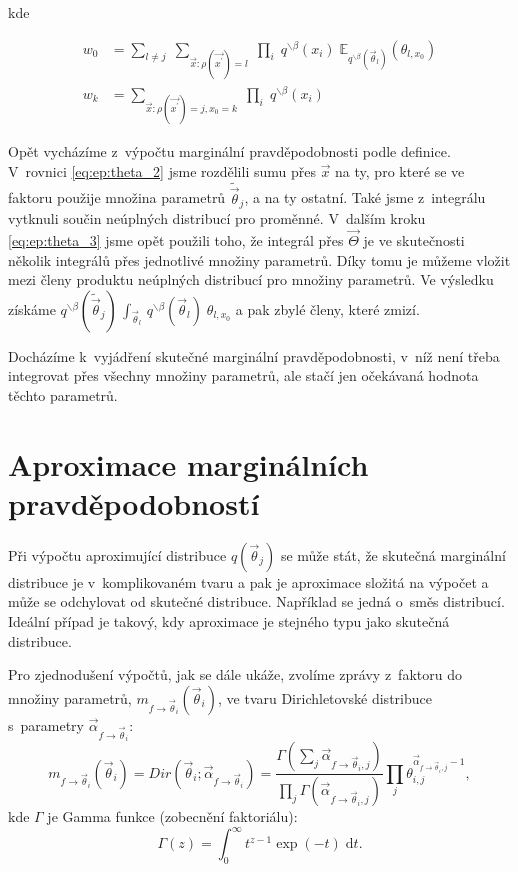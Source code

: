 kde

\begin{align}
w_0 &=
	\sum_{l \ne j} \;
		\sum_{\vec{x}: \rho(\vec{x^\prime}) = l} \;
			\prod_i \;
 				q^{\backslash \beta}(x_i) \;
				\mathbb{E}_{q^{\backslash \beta}(\vec{\theta}_l)} (
					\theta_{l,
					x_0}) 
\\
w_k &=
	\sum_{\vec{x}: \rho(\vec{x^\prime}) = j, x_0 = k} \; 
		\prod_i \;
			q^{\backslash \beta}(x_i)		
\end{align}

Opět vycházíme z~výpočtu marginální pravděpodobnosti podle definice.
V~rovnici \eqref{eq:ep:theta_2} jsme rozdělili sumu přes
$\vec{x}$ na ty, pro které se ve faktoru použije množina parametrů
$\tilde{\vec{\theta}}_j$, a na ty ostatní. Také jsme z~integrálu vytknuli součin
neúplných distribucí pro proměnné. V~dalším kroku \eqref{eq:ep:theta_3} jsme opět
použili toho, že integrál přes $\vec{\Theta}$ je ve skutečnosti několik
integrálů přes jednotlivé množiny parametrů. Díky tomu je můžeme vložit mezi členy produktu neúplných distribucí pro množiny parametrů. Ve výsledku
získáme $q^{\backslash \beta}(\tilde{\vec{\theta}}_j) \, \int_{\vec{\theta}_l} \,
q^{\backslash \beta}(\vec{\theta}_l) \; \theta_{l, x_0}$ a pak zbylé členy, které zmizí.

Docházíme k~vyjádření skutečné marginální pravděpodobnosti, v~níž není třeba
integrovat přes všechny množiny parametrů, ale stačí jen očekávaná hodnota
těchto parametrů.

\section{Aproximace marginálních pravděpodobností}

Při výpočtu aproximující distribuce $q(\vec{\theta}_j)$ se může stát, že skutečná marginální distribuce je v~komplikovaném tvaru a pak je aproximace složitá na výpočet a může se odchylovat od skutečné distribuce.
Například se jedná o~směs distribucí.
Ideální případ je takový, kdy aproximace je stejného typu jako skutečná distribuce.

Pro zjednodušení výpočtů, jak se dále ukáže, zvolíme zprávy z~faktoru do množiny parametrů, $m_{f \rightarrow \vec{\theta}_i}(\vec{\theta}_i)$, ve tvaru Dirichletovské distribuce s~parametry $\vec\alpha_{f \rightarrow \vec\theta_i}$:
\begin{equation}
m_{f \rightarrow \vec{\theta}_i}(\vec{\theta}_i) =
	Dir(\vec{\theta}_i; \vec\alpha_{f \rightarrow \vec\theta_i}) =
        \frac{\Gamma (\sum_j \vec\alpha_{f \rightarrow \vec\theta_i, j})}
             {\prod_j \Gamma(\vec\alpha_{f \rightarrow \vec\theta_i, j})}
        \prod_j \theta_{i,j}^{\vec\alpha_{f \rightarrow \vec\theta_i, j} - 1},
\end{equation}
kde $\Gamma$ je Gamma funkce (zobecnění faktoriálu):
\begin{equation}
    \Gamma(z) = \int_0^\infty \! t^{z-1} \exp(-t) \;\mathrm{d}t.
\end{equation}

